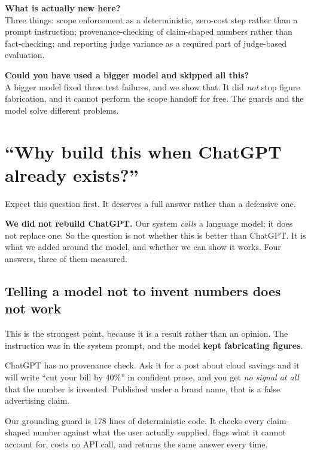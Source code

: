 \documentclass[11pt]{article}
\begin{document}
\vspace{5pt}
\noindent\textbf{What is actually new here?}\\
Three things: scope enforcement as a deterministic, zero-cost step rather than a
prompt instruction; provenance-checking of claim-shaped numbers rather than
fact-checking; and reporting judge variance as a required part of judge-based
evaluation.

\vspace{5pt}
\noindent\textbf{Could you have used a bigger model and skipped all this?}\\
A bigger model fixed three test failures, and we show that. It did \emph{not}
stop figure fabrication, and it cannot perform the scope handoff for free. The
guards and the model solve different problems.

\section{``Why build this when ChatGPT already exists?''}

Expect this question first. It deserves a full answer rather than a defensive
one.

\textbf{We did not rebuild ChatGPT.} Our system \emph{calls} a language model;
it does not replace one. So the question is not whether this is better than
ChatGPT. It is what we added around the model, and whether we can show it
works. Four answers, three of them measured.

\subsection{Telling a model not to invent numbers does not work}

This is the strongest point, because it is a result rather than an opinion. The
instruction was in the system prompt, and the model \textbf{kept fabricating
figures}.

ChatGPT has no provenance check. Ask it for a post about cloud savings and it
will write ``cut your bill by 40\%'' in confident prose, and you get \emph{no
signal at all} that the number is invented. Published under a brand name, that
is a false advertising claim.

Our grounding guard is 178 lines of deterministic code. It checks every
claim-shaped number against what the user actually supplied, flags what it
cannot account for, costs no API call, and returns the same answer every time.
\end{document}
